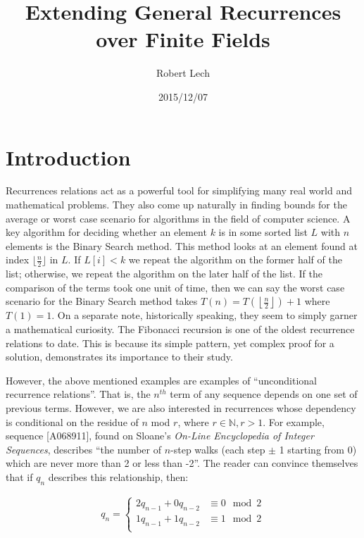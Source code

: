 \documentclass[a4paper]{article}
\title{Extending General Recurrences over Finite Fields}
\author{Robert Lech}
\date{2015/12/07}
\theoremstyle{definition}
\begin{document}
\maketitle

\section{Introduction}

Recurrences relations act as a powerful tool for simplifying many real world and mathematical problems.
They also come up naturally in finding bounds for the average or worst case scenario for algorithms in
the field of computer science. A key algorithm for deciding whether an element $k$ is in some sorted
list $L$ with $n$ elements is the Binary Search method. This method looks at an element found at index
$\lfloor\frac{n}{2}\rfloor$ in $L$. If $L[i]<k$ we repeat the algorithm on the former half of the list;
otherwise, we repeat the algorithm on the later half of the list. If the comparison of the terms took
one unit of time, then we can say the worst case scenario for the Binary Search method takes
$T(n)=T\left(\left\lfloor\frac{n}{2}\right\rfloor\right)+1$ where $T(1)=1$. On a separate note,
historically speaking, they seem to simply garner a mathematical curiosity. The Fibonacci recursion is
one of the oldest recurrence relations to date. This is because its simple pattern, yet complex proof
for a solution, demonstrates its importance to their study. 

However, the above mentioned examples are examples of ``unconditional recurrence relations''. That is,
the $n^{th}$ term of any sequence depends on one set of previous terms. However, we are also
interested in recurrences whose dependency is conditional on the residue of $n$ mod $r$, where $r\in
\mathbb{N}, r>1$. For example, sequence [A068911], found on Sloane's \textit{On-Line Encyclopedia of
Integer Sequences}, describes ``the number of $n$-step walks (each step $\pm$ 1 starting from 0) which
are never more than 2 or less than -2''\cite{bib:gen_cond_rec}. The reader can convince themselves that
if $q_n$ describes this relationship, then:

\begin{align*}
q_n=
\begin{cases}
2q_{n-1}+0q_{n-2} & \equiv 0 \mod 2 \\
1q_{n-1}+1q_{n-2} & \equiv 1 \mod 2 \\
\end{cases}
\end{align*}
\end{document}
